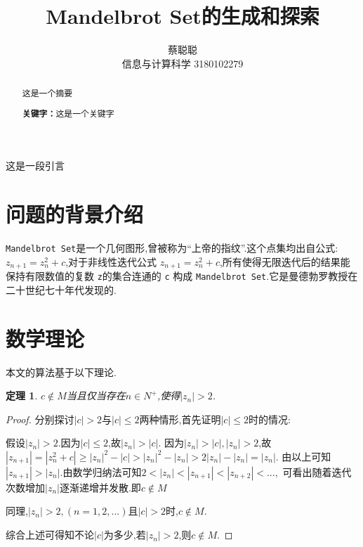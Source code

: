 \documentclass[a4paper]{ctexart}
\title{Mandelbrot Set的生成和探索}
\author{蔡聪聪\\信息与计算科学 3180102279}
\date{}
\begin{document}
\maketitle

\begin{abstract}
 这是一个摘要\par
\textbf{关键字：}这是一个关键字
\end{abstract}

这是一段引言

\section{问题的背景介绍}
\verb|Mandelbrot Set|是一个几何图形,曾被称为“上帝的指纹”.这个点集均出自公式: $z_{n+1}=z_n^2+c$,对于非线性迭代公式 $z_{n+1}=z_n^2+c$,所有使得无限迭代后的结果能保持有限数值的复数 \verb|z|的集合连通的 \verb|c| 构成 \verb|Mandelbrot Set|.\cite{ztr2013hd}它是曼德勃罗教授在二十世纪七十年代发现的.
\section{数学理论}
本文的算法基于以下理论.
\newtheorem{lemma}{定理}
\begin{lemma}
  $c \notin M$当且仅当存在$n \in N^+$,使得$|z_n|>2$.
\end{lemma}

\begin{proof}
分别探讨$|c|>2$与$|c|\leq 2$两种情形,首先证明$|c| \leq 2$时的情况:\par
假设$|z_n|>2$.因为$|c| \leq 2$,故$|z_n|>|c|$.
因为$|z_n|>|c|,|z_n|>2$,故$|z_{n+1}|=|z_n^2+c|\geq|z_n|^2-|c|>|z_n|^2-|z_n|>2|z_n|-|z_n|=|z_n|$.
由以上可知$|z_{n+1}|>|z_n|$.由数学归纳法可知$2<|{z_n}|<|z_{n+1}|<|z_{n+2}|<...,$ 可看出随着迭代次数增加$|z_n|$逐渐递增并发散.即$c\notin M$\par
同理,$|z_{n}|>2,(n=1,2,...)$且$|c|>2$时,$c\notin M$.\par
综合上述可得知不论$|c|$为多少,若$|z_n|>2$,则$c\notin M$.
\end{proof}
\end{document}

